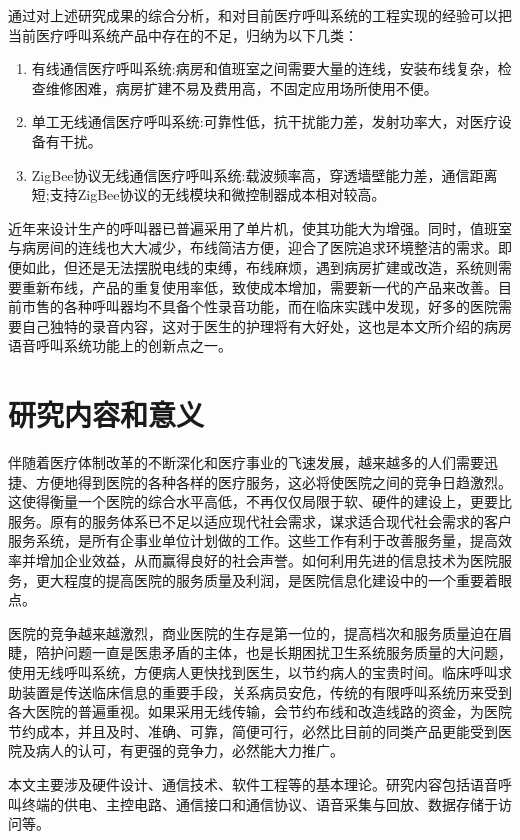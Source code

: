 通过对上述研究成果的综合分析，和对目前医疗呼叫系统的工程实现的经验可以把当前医疗呼叫系统产品中存在的不足，归纳为以下几类：
\begin{enumerate}
   \item 有线通信医疗呼叫系统:病房和值班室之间需要大量的连线，安装布线复杂，检查维修困难，病房扩建不易及费用高，不固定应用场所使用不便。
   \item 单工无线通信医疗呼叫系统:可靠性低，抗干扰能力差，发射功率大，对医疗设备有干扰。
   \item ZigBee协议无线通信医疗呼叫系统:载波频率高，穿透墙壁能力差，通信距离短;支持ZigBee协议的无线模块和微控制器成本相对较高。
\end{enumerate}

近年来设计生产的呼叫器已普遍采用了单片机，使其功能大为增强。同时，值班室与病房间的连线也大大减少，布线简洁方便，迎合了医院追求环境整洁的需求。即便如此，但还是无法摆脱电线的束缚，布线麻烦，遇到病房扩建或改造，系统则需要重新布线，产品的重复使用率低，致使成本增加，需要新一代的产品来改善。目前市售的各种呼叫器均不具备个性录音功能，而在临床实践中发现，好多的医院需要自己独特的录音内容，这对于医生的护理将有大好处，这也是本文所介绍的病房语音呼叫系统功能上的创新点之一。

\section{研究内容和意义}
伴随着医疗体制改革的不断深化和医疗事业的飞速发展，越来越多的人们需要迅捷、方便地得到医院的各种各样的医疗服务，这必将使医院之间的竞争日趋激烈。这使得衡量一个医院的综合水平高低，不再仅仅局限于软、硬件的建设上，更要比服务。原有的服务体系已不足以适应现代社会需求，谋求适合现代社会需求的客户服务系统，是所有企事业单位计划做的工作。这些工作有利于改善服务量，提高效率并增加企业效益，从而赢得良好的社会声誉。如何利用先进的信息技术为医院服务，更大程度的提高医院的服务质量及利润，是医院信息化建设中的一个重要着眼点。

医院的竞争越来越激烈，商业医院的生存是第一位的，提高档次和服务质量迫在眉睫，陪护问题一直是医患矛盾的主体，也是长期困扰卫生系统服务质量的大问题，使用无线呼叫系统，方便病人更快找到医生，以节约病人的宝贵时间。临床呼叫求助装置是传送临床信息的重要手段，关系病员安危，传统的有限呼叫系统历来受到各大医院的普遍重视。如果采用无线传输，会节约布线和改造线路的资金，为医院节约成本，并且及时、准确、可靠，简便可行，必然比目前的同类产品更能受到医院及病人的认可，有更强的竞争力，必然能大力推广。

本文主要涉及硬件设计、通信技术、软件工程等的基本理论。研究内容包括语音呼叫终端的供电、主控电路、通信接口和通信协议、语音采集与回放、数据存储于访问等。

